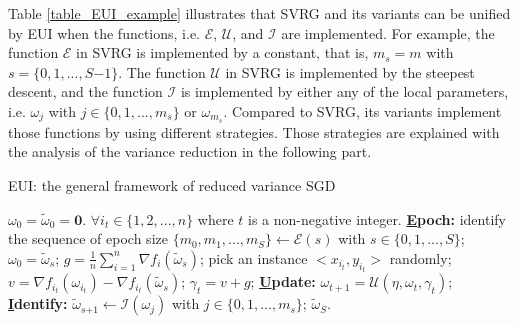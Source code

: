 \documentclass[letterpaper]{article}
\begin{document}
Table \ref{table_EUI_example} illustrates that SVRG and  its variants can be unified by EUI when  the functions, i.e. $\mathcal{E}$, $\mathcal{U}$, and $\mathcal{I}$ are implemented. For example,  the function $\mathcal{E}$ in SVRG is implemented by a constant, that is, $m_s\mathrm{=}m$ with $s\mathrm{=}\{0,1, ..., S\mathrm{-}1\}$. The function $\mathcal{U}$ in SVRG is  implemented by the steepest descent, and the function $\mathcal{I}$ is implemented by either any of the local parameters, i.e. $\omega_j$ with $j\in\{0,1, ..., m_s\}$ or $\omega_{m_s}$.  Compared to  SVRG, its variants implement those functions by using different strategies. Those strategies are explained with the analysis of the variance reduction in the following part. 




\begin{algorithm}[t]
    \caption{EUI: the general framework of  reduced variance SGD}
    \label{algorithm_EUI}
    \begin{algorithmic}[1]
        \Require $\omega_0\mathrm{=}\tilde{\omega}_0\mathrm{=}\mathbf{0}$. $\forall i_t\mathrm{\in}\{1,2, ..., n\}$ where $t$ is a non-negative integer.
        \State \textbf{\uline{E}poch:} identify the sequence of  epoch size $\{m_0, m_1, ..., m_S\}\mathrm{\leftarrow} \mathcal{E}(s)$ with $s\in\{0,1, ..., S\}$;
            \State $\omega_0=\tilde{\omega}_s$;
            \State $g=\frac{1}{n}\sum\limits_{i=1}^n\nabla f_i(\tilde{\omega}_s)$;
                \State pick an instance $\mathrm{<}x_{i_t}, y_{i_t}\mathrm{>}$ randomly;
                \State  $v=\nabla f_{i_t}(\omega_{i_t})-\nabla f_{i_t}(\tilde{\omega}_s)$;
                \State $\gamma_{t}=v+g$;
                \State \textbf{\uline{U}pdate:} $\omega_{t+1}=\mathcal{U}(\eta, \omega_{t}, \gamma_{t})$;
            \EndFor
            \State \textbf{\uline{I}dentify:} $\tilde{\omega}_{s\mathrm{+}1}\mathrm{\leftarrow}\mathcal{I}(\omega_j)$ with $j\mathrm{\in}\{0,1, ..., m_s\}$;
        \EndFor
        \Return $\tilde{\omega}_S$.
    \end{algorithmic}
\end{algorithm}
\end{document}
